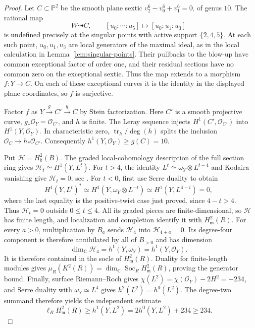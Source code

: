 \documentclass[11pt,reqno]{amsart}
\numberwithin{equation}{section}
\theoremstyle{definition}
\theoremstyle{remark}
\newcommand{\C}{\mathbb C}
\newcommand{\PP}{\mathbb P}
\newcommand{\OO}{\mathcal O}
\newcommand{\mm}{\mathfrak m}
\newcommand{\bb}{\mathfrak b}
\newcommand{\len}{\ell}
\begin{document}
\begin{proof}
Let $C\subset\PP^2$ be the smooth plane sextic
$v_2^6-v_0^6+v_1^6=0$, of genus $10$.
The rational map
\[
 W\dashrightarrow C,\qquad
 [u_0:\cdots:u_5]\longmapsto[u_0:u_1:u_3]
\]
is undefined precisely at the singular points with active support
$\{2,4,5\}$. At each such point, $u_0,u_1,u_3$ are local generators
of the maximal ideal, as in the local calculation in
Lemma~\ref{lem:singular-points}. Their pullbacks to the blow-up have
common exceptional factor of order one, and their residual sections
have no common zero on the exceptional sextic. Thus the map extends
to a morphism $f:Y\to C$. On each of these exceptional curves it
is the identity in the displayed plane coordinates, so $f$ is
surjective.

Factor $f$ as $Y\xrightarrow{g}C'\xrightarrow{h}C$ by Stein
factorization. Here $C'$ is a smooth projective curve,
$g_*\OO_Y=\OO_{C'}$, and $h$ is finite.
The Leray sequence injects $H^1(C',\OO_{C'})$ into $H^1(Y,\OO_Y)$.
In characteristic zero, $\operatorname{tr}_h/\deg(h)$ splits the
inclusion $\OO_C\to h_*\OO_{C'}$. Consequently
$h^1(Y,\OO_Y)\geq g(C)=10$.

Put $\mathcal H=H^2_\bb(B)$. The graded local-cohomology description
of the full section ring gives
$\mathcal H_t\simeq H^1(Y,L^t)$.
For $t>4$, the identity $L^t\simeq\omega_Y\otimes L^{t-4}$ and
Kodaira vanishing give $\mathcal H_t=0$; see
\cite[Chapter III, Remark 7.15, pp.\ 248--249]{Hartshorne1977}.
For $t<0$, first use Serre duality to obtain
\[
 H^1(Y,L^t)^*\simeq H^1(Y,\omega_Y\otimes L^{-t})
                  \simeq H^1(Y,L^{4-t})=0,
\]
where the last equality is the positive-twist case just proved, since
$4-t>4$. Thus $\mathcal H_t=0$ outside $0\leq t\leq4$.
All its graded pieces are finite-dimensional, so $\mathcal H$ has
finite length, and localization and completion identify it with
$H^2_\mm(R)$. For every $a>0$, multiplication by $B_a$ sends
$\mathcal H_4$ into $\mathcal H_{4+a}=0$. Its degree-four component is
therefore annihilated by all of $B_{>0}$ and has dimension
\[
 \dim_\C\mathcal H_4=h^1(Y,\omega_Y)=h^1(Y,\OO_Y).
\]
It is therefore contained in the socle of $H^2_\mm(R)$.
Duality for finite-length modules gives
$\mu_R(K^2(R))=\dim_\C\operatorname{Soc}_R H^2_\mm(R)$,
proving the generator bound.
Finally, surface Riemann--Roch gives
$\chi(L^2)=\chi(\OO_Y)-2H^2=-234$, and Serre duality with
$\omega_Y\simeq L^4$ gives $h^2(L^2)=h^0(L^2)$. The degree-two
summand therefore yields the independent estimate
\[
 \len_R H^2_\mm(R)\geq h^1(Y,L^2)
 =2h^0(Y,L^2)+234\geq234.
\]
\end{proof}
\end{document}
